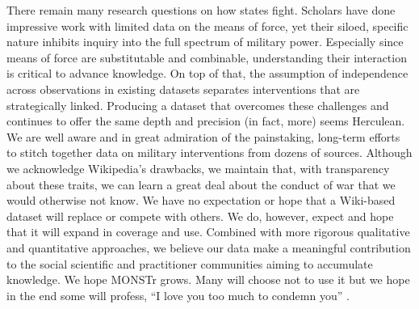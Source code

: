 \documentclass[fleqn,12pt]{article}
\begin{document}
There remain many research questions on how states fight. Scholars have done impressive work with limited data on the means of force, yet their siloed, specific nature inhibits inquiry into the full spectrum of military power. Especially since means of force are substitutable and combinable, understanding their interaction is critical to advance knowledge. On top of that, the assumption of independence across observations in existing datasets separates interventions that are strategically linked. Producing a dataset that overcomes these challenges and continues to offer the same depth and precision (in fact, more) seems Herculean. We are well aware and in great admiration of the painstaking, long-term efforts to stitch together data on military interventions from dozens of sources. Although we acknowledge Wikipedia's drawbacks, we maintain that, with transparency about these traits, we can learn a great deal about the conduct of war that we would otherwise not know. We have no expectation or hope that a Wiki-based dataset will replace or compete with others. We do, however, expect and hope that it will expand in coverage and use. Combined with more rigorous qualitative and quantitative approaches, we believe our data make a meaningful contribution to the social scientific and practitioner communities aiming to accumulate knowledge. We hope MONSTr grows. Many will choose not to use it but we hope in the end some will profess, ``I love you too much to condemn you” \citep{coppola_dracula_1992}.

\newpage
\end{document}
